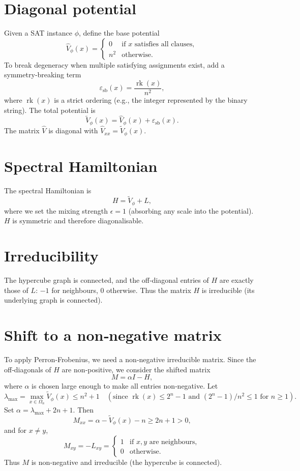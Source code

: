 \documentclass[11pt,a4paper]{article}
\begin{document}
\section{Diagonal potential}

Given a SAT instance \(\phi\), define the base potential
\[
\hat{V}_{\phi}(x) = \begin{cases}
0 & \text{if } x \text{ satisfies all clauses},\\
n^2 & \text{otherwise}.
\end{cases}
\]
To break degeneracy when multiple satisfying assignments exist, add a symmetry‑breaking term
\[
\varepsilon_{\mathrm{sb}}(x) = \frac{\operatorname{rk}(x)}{n^2},
\]
where \(\operatorname{rk}(x)\) is a strict ordering (e.g., the integer represented by the binary string). The total potential is
\[
\tilde{V}_{\phi}(x) = \hat{V}_{\phi}(x) + \varepsilon_{\mathrm{sb}}(x).
\]
The matrix \(\hat{V}\) is diagonal with \(\hat{V}_{xx} = \tilde{V}_{\phi}(x)\).

\section{Spectral Hamiltonian}

The spectral Hamiltonian is
\[
H = \tilde{V}_{\phi} + L,
\]
where we set the mixing strength \(\epsilon = 1\) (absorbing any scale into the potential). \(H\) is symmetric and therefore diagonalisable.

\section{Irreducibility}

The hypercube graph is connected, and the off‑diagonal entries of \(H\) are exactly those of \(L\): \(-1\) for neighbours, \(0\) otherwise. Thus the matrix \(H\) is irreducible (its underlying graph is connected).

\section{Shift to a non‑negative matrix}

To apply Perron‑Frobenius, we need a non‑negative irreducible matrix. Since the off‑diagonals of \(H\) are non‑positive, we consider the shifted matrix
\[
M = \alpha I - H,
\]
where \(\alpha\) is chosen large enough to make all entries non‑negative. Let
\[
\lambda_{\max} = \max_{x\in\Omega_n} \tilde{V}_{\phi}(x) \le n^2 + 1 \quad (\text{since } \operatorname{rk}(x) \le 2^n-1 \text{ and } (2^n-1)/n^2 \le 1 \text{ for } n\ge 1).
\]
Set \(\alpha = \lambda_{\max} + 2n + 1\). Then
\[
M_{xx} = \alpha - \tilde{V}_{\phi}(x) - n \ge 2n+1 > 0,
\]
and for \(x\neq y\),
\[
M_{xy} = -L_{xy} = 
\begin{cases}
1 & \text{if } x,y \text{ are neighbours},\\
0 & \text{otherwise}.
\end{cases}
\]
Thus \(M\) is non‑negative and irreducible (the hypercube is connected).
\end{document}
